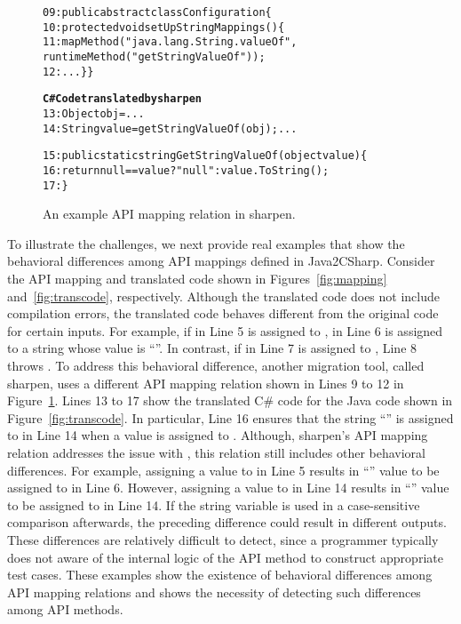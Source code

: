 
\begin{figure}
\begin{CodeOut}
\begin{alltt}
09: public abstract class Configuration \{
10: protected void setUpStringMappings() \{
11:   mapMethod("java.lang.String.valueOf",
              runtimeMethod("getStringValueOf"));
12: ...\} \}

\textbf{C# Code translated by sharpen}
13: Object obj = ...
14: String value = getStringValueOf(obj); ...

15: public static string GetStringValueOf(object value)\{
16:   return null == value? "null": value.ToString();
17: \}
\end{alltt}
\end{CodeOut}\vspace*{-4ex}
\caption{\label{fig:sharpen} An example API mapping relation in sharpen.}\vspace*{-4ex}
\end{figure}

To illustrate the challenges, we next provide real examples that show the behavioral differences among API mappings defined in Java2CSharp. Consider the API mapping and translated code shown in Figures~\ref{fig:mapping} and~\ref{fig:transcode}, respectively. Although the translated code does not include compilation errors, the translated code behaves different from the original code for certain inputs. For example, if  in Line 5 is assigned to ,   in Line 6 is assigned to a string whose value is ``''. In contrast, if  in Line 7 is assigned to , Line 8 throws . To address this behavioral difference, another migration tool, called sharpen, uses a different API mapping relation shown in Lines 9 to 12 in Figure~\ref{fig:sharpen}. Lines 13 to 17 show the translated C\# code for the Java code shown in Figure~\ref{fig:transcode}. In particular, Line 16 ensures that the string ``'' is assigned to  in Line 14 when a  value is assigned to . Although, sharpen's API mapping relation addresses the issue with , this relation still includes other behavioral differences. For example, assigning a  value to  in Line 5 results in ``'' value to be assigned to  in Line 6. However, assigning a  value to  in Line 14 results in ``'' value to be assigned to  in Line 14. If the string variable  is used in a case-sensitive comparison afterwards, the preceding difference could result in different outputs. These differences are relatively difficult to detect, since a programmer typically does not aware of the internal logic of the API method to construct appropriate test cases. These examples show the existence of behavioral differences among API mapping relations and shows the necessity of detecting such differences among API methods.

